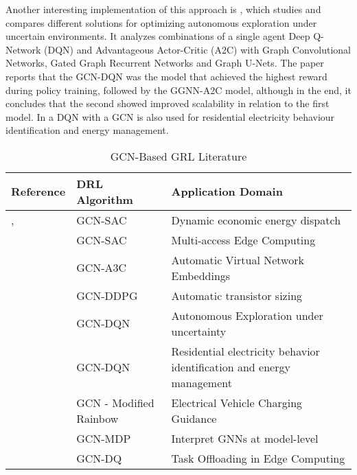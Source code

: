 Another interesting implementation of this approach is \cite{chenAutonomousExplorationUncertainty2020}, which studies and compares different solutions for optimizing autonomous exploration under uncertain environments. It analyzes combinations of a single agent Deep Q-Network (DQN) and Advantageous Actor-Critic (A2C) with Graph Convolutional Networks, Gated Graph Recurrent Networks and Graph U-Nets. The paper reports that the GCN-DQN was the model that achieved the highest reward during policy training, followed by the GGNN-A2C model, although in the end, it concludes that the second showed improved scalability in relation to the first model. In \cite{chenGraphRepresentationLearningbased2023} a DQN with a GCN is also used for residential electricity behaviour identification and energy management.

\begin{table}[h!]
	\centering
	\caption{GCN-Based GRL Literature}
	\begin{tabular}{|P{2cm}|P{2cm}|p{5cm}|  }
		\hline
		\textbf{Reference} & \textbf{DRL Algorithm} & \textbf{Application Domain} \\
		\hline
		\cite{liNovelGraphReinforcement2022}, \cite{chenScalableGraphReinforcement2023} & GCN-SAC & Dynamic economic energy dispatch \\ \hline
		\cite{lengGraphConvolutionalNetworkbased2021} & GCN-SAC & Multi-access Edge Computing \\ \hline
		\cite{yanAutomaticVirtualNetwork2020} & GCN-A3C & Automatic Virtual Network Embeddings \\ \hline
		\cite{wangGCNRLCircuitDesigner2020} & GCN-DDPG & Automatic transistor sizing \\ \hline
		\cite{chenAutonomousExplorationUncertainty2020} & GCN-DQN  & Autonomous Exploration under uncertainty \\  \hline
		\cite{chenGraphRepresentationLearningbased2023} & GCN-DQN & Residential electricity behavior identification and energy management \\ \hline
		\cite{xingGraphReinforcementLearningBased2023} & GCN - Modified Rainbow & Electrical Vehicle Charging Guidance \\ \hline
		\cite{yuanXGNNModelLevelExplanations2020} & GCN-MDP & Interpret GNNs at model-level \\ \hline
		\cite{tangDependentTaskOffloading2020} & GCN-DQ & Task Offloading in Edge Computing \\ \hline
	\end{tabular}
\end{table}




